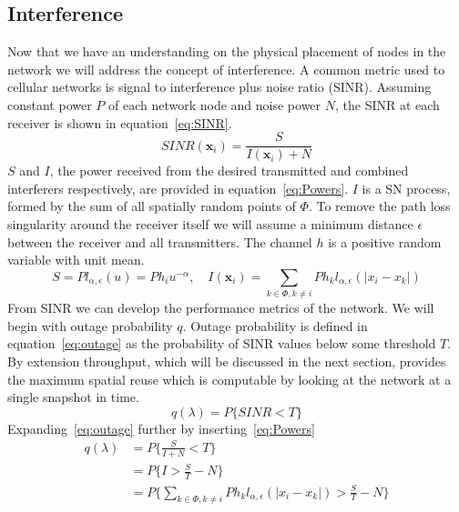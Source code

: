 \subsection{Interference}
%
Now that we have an understanding on the physical placement of nodes in the network we will address the concept of interference.  A common metric used to cellular networks is signal to interference plus noise ratio (SINR).  Assuming constant power $P$ of each network node and noise power $N$, the SINR at each receiver is shown in equation~\eqref{eq:SINR}.
%
\begin{equation}\label{eq:SINR}
  SINR(\textbf{x}_i) = \frac{S}{I(\textbf{x}_i) + N}
\end{equation}
%
$S$ and $I$, the power received from the desired transmitted and combined interferers respectively, are provided in equation~\eqref{eq:Powers}.  $I$ is a SN process, formed by the sum of all spatially random points of $\Phi$.  To remove the path loss singularity around the receiver itself we will assume a minimum distance $\epsilon$ between the receiver and all transmitters.  The channel $h$ is a positive random variable with unit mean.
%
\begin{equation}\label{eq:Powers}
  S = Pl_{\alpha,\epsilon}(u) = Ph_iu^{-\alpha},\quad I(\textbf{x}_i)=\sum_{k\in \Phi,k\neq i} Ph_kl_{\alpha,\epsilon}(|x_i-x_k|)
\end{equation}
%
%
%
\iffalse %
%
From SINR we can develop the performance metrics of the network.  We will begin with outage probability $q$.  Outage probability is defined in equation~\eqref{eq:outage} as the probability of SINR values below some threshold $T$.  By extension throughput, which will be discussed in the next section, provides the maximum spatial reuse which is computable by looking at the network at a single snapshot in time.
%
\begin{equation}\label{eq:outage}
  q(\lambda) = P\{SINR<T\}
\end{equation}
%
Expanding~\eqref{eq:outage} further by inserting~\eqref{eq:Powers}
%
\begin{equation}\label{eq:outageMore}
  \begin{split}
  q(\lambda) &= P\Big\{\frac{S}{I + N}<T\Big\}\\
  &= P\Big\{I > \frac{S}{T} - N\Big\} \\
  &= P\Big\{\sum_{k\in \Phi,k\neq i} Ph_kl_{\alpha,\epsilon}(|x_i-x_k|) > \frac{S}{T} - N\Big\}
\end{split}
\end{equation}
